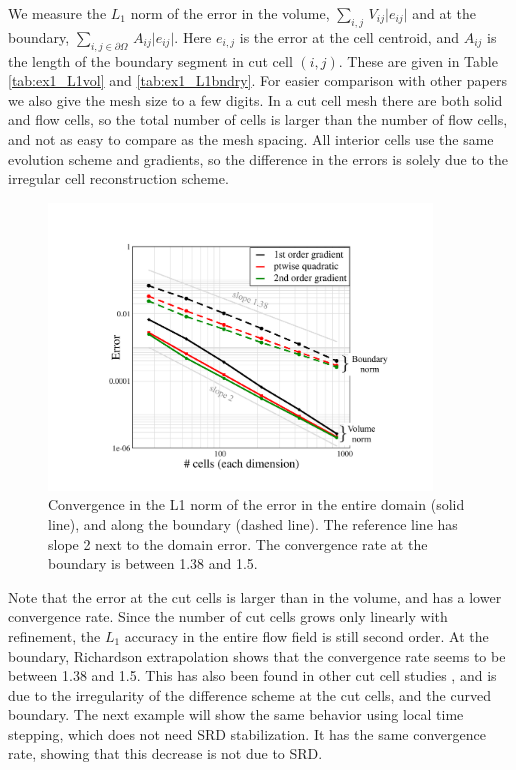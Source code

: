 We measure the $L_1$ norm of the error in the volume,   $\sum_{i,j} \,
V_{ij} \lvert e_{ij } \rvert$ and at the boundary, $ \sum_{{i,j} \in \partial \Omega} \, A_{ij} \lvert e_{ij
} \rvert$.  Here
$e_{i,j}$ is the error at the cell centroid, and $A_{ij}$ is the length of the 
boundary segment in cut cell $(i,j)$.
These are given in Table \ref{tab:ex1_L1vol} and \ref{tab:ex1_L1bndry}. 
For easier comparison with other papers we also give the mesh size 
to a few digits. In  a cut cell mesh there are both solid and
flow cells, so the total number of cells is larger than the number of
flow cells, and not as easy to compare as the mesh spacing.
All interior cells use the same evolution scheme and gradients, so
the difference in the errors is solely due to the irregular cell
reconstruction scheme.

\begin{figure}[h]
\begin{center}
\includegraphics[height=3.0in]{figs/gradientConv.pdf}
\caption{\sf Convergence in the L1 norm of the error in the entire 
domain  (solid line), and along the boundary (dashed line).
The reference line has slope 2 next to the domain error. The convergence
rate at the boundary is between 1.38 and 1.5.
\label{fig:ssv}}
\end{center}
\end{figure}


Note that the error at the cut cells is larger than in the volume, and has a
lower convergence rate. Since the number of cut cells grows only
linearly with refinement, the $L_1$
accuracy in the entire flow field is still second order.  At the boundary,
Richardson extrapolation shows that the convergence rate seems to be
between 1.38 and 1.5.
This has also been found in other cut cell studies
\cite{KB:2006,nemec_tm14}, and is due to the irregularity of the
difference scheme at the cut cells, and the curved boundary. 
The next example will show the same behavior using local time stepping,
which does not need SRD stabilization. It has the same convergence rate,
showing that this decrease is
not due to SRD.

